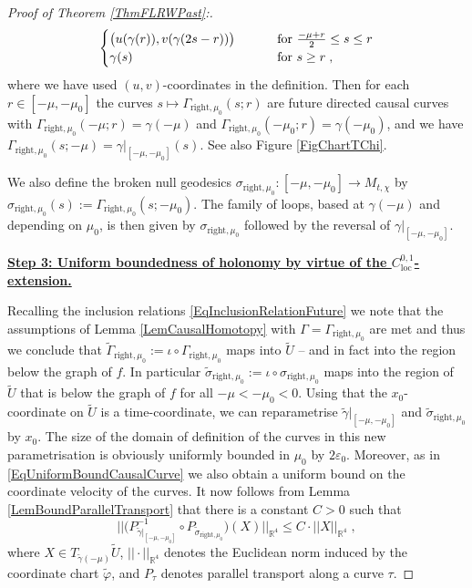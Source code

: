 \documentclass[reqno]{article}
\newcommand{\R}{\mathbb{R}}
\newcommand{\loc}{\mathrm{loc}}
\begin{document}
\begin{proof}[Proof of Theorem \ref{ThmFLRWPast}:]
\begin{equation*}
\begin{cases}
\big(u(\gamma(r)), v(\gamma(2s - r))\big) \qquad &\textnormal{ for } \frac{-\mu + r}{2} \leq s \leq r \\
\gamma(s) &\textnormal{ for } s \geq r \;,
\end{cases}
\end{equation*}
where we have used $(u,v)$-coordinates in the definition. Then for each $r \in [-\mu, -\mu_0]$ the curves $ s \mapsto \Gamma_{\mathrm{right}, \mu_0} (s ; r)$ are future directed causal curves with $\Gamma_{\mathrm{right}, \mu_0} (-\mu;r) = \gamma(-\mu)$ and $\Gamma_{\mathrm{right}, \mu_0} (-\mu_0; r) = \gamma(-\mu_0)$, and we have $\Gamma_{\mathrm{right}, \mu_0} (s; -\mu) = \gamma|_{[-\mu, -\mu_0]}(s)$. See also Figure \ref{FigChartTChi}.

We also define the broken null geodesics $\sigma_{\mathrm{right}, \mu_0} : [-\mu, -\mu_0] \to M_{t,\chi}$ by $\sigma_{\mathrm{right}, \mu_0}(s) := \Gamma_{\mathrm{right}, \mu_0}(s; -\mu_0)$. The family of loops, based at $\gamma(-\mu)$ and depending on $\mu_0$, is then given by $\sigma_{\mathrm{right}, \mu_0}$ followed by the reversal of $\gamma|_{[-\mu, -\mu_0]}$.
\newline

\underline{\textbf{Step 3: Uniform boundedness of holonomy by virtue of the $C^{0,1}_{\loc}$-extension.}}

Recalling the inclusion relations \eqref{EqInclusionRelationFuture} we note that the assumptions of Lemma \ref{LemCausalHomotopy} with $\Gamma = \Gamma_{\mathrm{right}, \mu_0}$ are met and thus we conclude that $\tilde{\Gamma}_{\mathrm{right}, \mu_0} := \iota \circ \Gamma_{\mathrm{right}, \mu_0}$ maps into $\tilde{U}$ -- and in fact into the region below the graph of $f$. In particular $\tilde{\sigma}_{\mathrm{right}, \mu_0} := \iota \circ \sigma_{\mathrm{right}, \mu_0}$ maps into the region of $\tilde{U}$ that is below the graph of $f$ for all $-\mu < -\mu_0 < 0$. Using that the $x_0$-coordinate on $\tilde{U}$ is a time-coordinate, we can reparametrise $\tilde{\gamma}|_{[-\mu, -\mu_0]}$ and $\tilde{\sigma}_{\mathrm{right}, \mu_0}$ by $x_0$. The size of the domain of definition of the curves in this new parametrisation is obviously uniformly bounded in $\mu_0$ by $2\varepsilon_0$. Moreover, as in \eqref{EqUniformBoundCausalCurve} we also obtain a uniform bound on the coordinate velocity of the curves. It now follows from Lemma \ref{LemBoundParallelTransport} that there is a constant $C>0$ such that 
\begin{equation}\label{EqUnifBoundPT}
|| \big(P^{-1}_{\tilde{\gamma}|_{[-\mu,-\mu_0]} }\circ P_{\tilde{\sigma}_{\mathrm{right}, \mu_0}} \big)(X) ||_{\R^{4}} \leq C \cdot ||X||_{\R^4} \;,
\end{equation}
where $X \in T_{ \tilde{\gamma}(-\mu) }\tilde{U}$, $|| \cdot ||_{\R^4}$ denotes the Euclidean norm induced by the coordinate chart $\tilde{\varphi}$, and $P_\tau$ denotes parallel transport along a curve $\tau$.
\newline


\end{proof}
\end{document}
